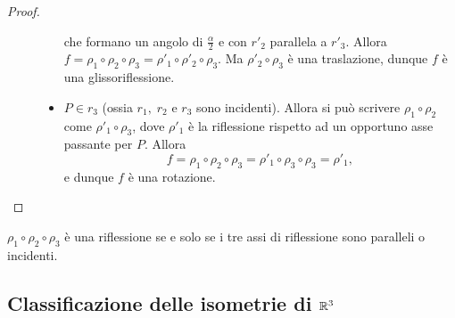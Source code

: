 \documentclass[a4paper,12pt]{article}
\newcommand{\Got}[1]{#1}
\newcommand{\got}[1]{{#1}}
\begin{document}
\begin{proof}
\begin{description}
\begin{itemize}
  \Got{che formano un angolo di} $\got{\frac{\alpha}{2}}$ \Got{e con} $\got{r'_2}$ \Got{parallela a} $\got{r'_3}$.
  \Got{Allora} $\got{f=\rho_1}\circ\got{\rho_2}\circ\got{\rho_3=\rho'_1}\circ\got{\rho'_2}\circ\got{\rho_3}$. \Got{Ma}
  $\got{\rho'_2}\circ\got{\rho_3}$
  \Got{è una traslazione, dunque} $\got{f}$ \Got{è una glissoriflessione}.
  \item $\got{\got{P\in r_3}}$ \Got{(ossia} $\got{r_1,\; r_2}$ \Got{e} $\got{r_3}$ \Got{sono incidenti). Allora si può scrivere}
  $\got{\rho_1}\circ\got{\rho_2}$ \Got{come} $\got{\rho'_1}\circ\got{\rho_3}$, \Got{dove} $\got{\rho'_1}$ \Got{è la riflessione rispetto ad un
  opportuno asse passante per} $\got{P}$.
  \Got{Allora} $$\got{f=\rho_1}\circ\got{\rho_2}\circ\got{\rho_3=\rho'_1}\circ\got{\rho_3}\circ\got{\rho_3=\rho'_1,}$$ \Got{e dunque} $\got{f}$ \Got{è una rotazione.} 
 \end{itemize}
 \end{description}
  \end{proof}
 \begin{remark}
 \Got{}$\got{\rho_1}\circ\got{\rho_2}\circ\got{\rho_3}$ \Got{è una riflessione se e solo se i tre assi di riflessione sono paralleli
 o incidenti.}
 \end{remark}
 
  \subsection{Classificazione delle isometrie di $\got{\R^3}$}
  
\end{document}
